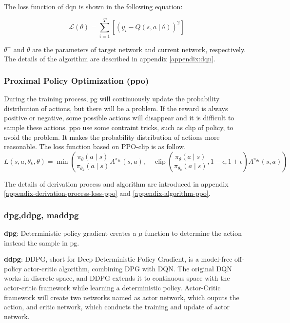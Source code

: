 The loss function of \gls{dqn} is shown in the following equation:

\begin{equation}
\mathcal{L}(\theta)=\sum_{i=1}^{T}\left[\left(y_{i}-Q(s, a \mid \theta)\right)^{2}\right]
\end{equation}

$\theta^{-}$ and $\theta$ are the parameters of target network and current network, respectively. The details of the algorithm are described in appendix \ref{appendix:dqn}.

\subsubsection{Proximal Policy Optimization (\gls{ppo})}
During the training process, \gls{pg} will continuously update the probability distribution of actions, but there will be a problem. If the reward is always positive or negative, some possible actions will disappear and it is difficult to sample these actions. \gls{ppo} use some contraint tricks, such as clip of policy, to avoid the problem. It makes the probability distribution of actions more reasonable. The loss function based on PPO-clip is as follow.
\begin{equation}
L\left(s, a, \theta_{k}, \theta\right)=\min \left(\frac{\pi_{\theta}(a \mid s)}{\pi_{\theta_{k}}(a \mid s)} A^{\pi_{\theta_{k}}}(s, a), \quad \operatorname{clip}\left(\frac{\pi_{\theta}(a \mid s)}{\pi_{\theta_{k}}(a \mid s)}, 1-\epsilon, 1+\epsilon\right) A^{\pi_{\theta_{k}}}(s, a)\right)
\end{equation} 

The details of derivation process and algorithm are introduced in appendix \ref{appendix-derivation-process-loss-ppo} and \ref{appendix-algorithm-ppo}.

\subsubsection{\gls{dpg},\gls{ddpg}, \gls{maddpg}} \label{background:maddpg}

\textbf{\gls{dpg}}: Deterministic policy gradient creates a $\mu$ function to determine the action instead the sample in \gls{pg}.

\textbf{\gls{ddpg}}: DDPG\parencite{Lillicrap2015}, short for Deep Deterministic Policy Gradient, is a model-free off-policy actor-critic algorithm, combining DPG with DQN. The original DQN works in discrete space, and DDPG extends it to continuous space with the actor-critic framework while learning a deterministic policy. Actor-Critic framework will create two networks named as actor network, which ouputs the action, and critic network, which conducts the training and update of actor network.

